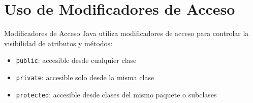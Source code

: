 \documentclass{beamer}
\begin{document}
\section{Uso de Modificadores de Acceso}
\begin{frame}{Modificadores de Acceso}
Java utiliza modificadores de acceso para controlar la visibilidad de atributos y métodos:

\begin{itemize}
    \item \texttt{public}: accesible desde cualquier clase
    \item \texttt{private}: accesible solo desde la misma clase
    \item \texttt{protected}: accesible desde clases del mismo paquete o subclases
\end{itemize}
\end{frame}
\end{document}
